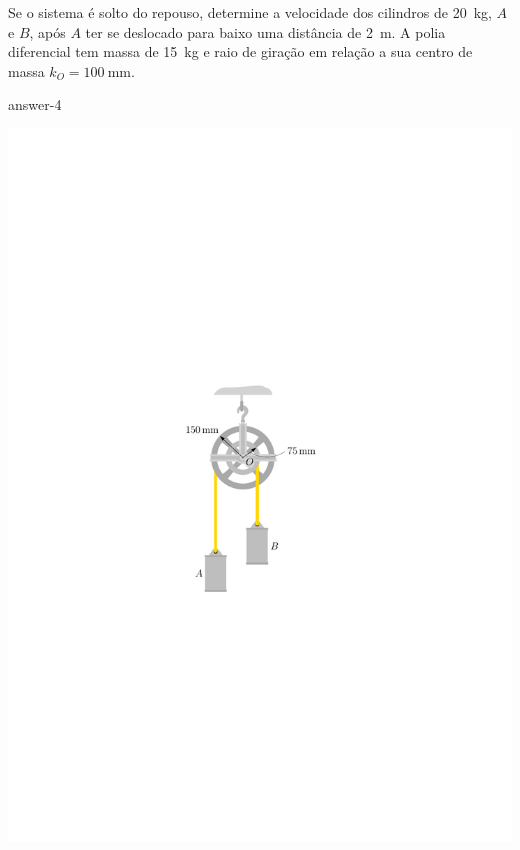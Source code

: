 \item Se o sistema é solto do repouso, determine a velocidade dos cilindros de \SI{20}{\kilogram}, $A$ e $B$, após $A$ ter se
deslocado para baixo uma distância de \SI{2}{\meter}. A polia diferencial tem massa de \SI{15}{\kilogram} e raio de giração
em relação a sua centro de massa $k_{O}=\SI{100}{\milli\meter}$.

{answer-4}

\vspace{-1.5cm}
\begin{flushright}
	\includegraphics[scale=1.]{../../images/draw_3}
\end{flushright}